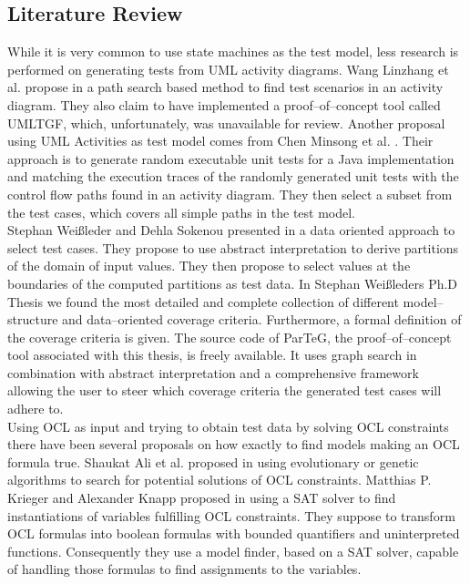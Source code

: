 \documentclass[runningheads,a4paper]{llncs}%
\begin{document}
\subsection{Literature Review}%
While it is very common to use state machines as the test model, less research is performed on generating tests from UML activity diagrams. Wang Linzhang et al. propose in \cite{Linzhang04GeneratingTestCasefromActivityGrayBoxMethod} a path search based method to find test scenarios in an activity diagram. They also claim to have implemented a proof--of--concept tool called UMLTGF, which, unfortunately, was unavailable for review. Another proposal using UML Activities as test model comes from Chen Minsong et al. \cite{mingsong2006automatic}. Their approach is to generate random executable unit tests for a Java implementation and matching the execution traces of the randomly generated unit tests with the control flow paths found in an activity diagram. They then select a subset from the test cases, which covers all simple paths in the test model.%
\\%
Stephan Wei{\ss}leder and Dehla Sokenou presented in \cite{weissleder2008automatic} a data oriented approach to select test cases. They propose to use abstract interpretation to derive partitions of the domain of input values. They then propose to select values at the boundaries of the computed partitions as test data.%
In Stephan Wei{\ss}leders Ph.D Thesis \cite{ParTeG} we found the most detailed and complete collection of different model--structure and data--oriented coverage criteria. Furthermore, a formal definition of the coverage criteria is given. The source code of ParTeG, the proof--of--concept tool associated with this thesis, is freely available. It uses graph search in combination with abstract interpretation and a comprehensive framework allowing the user to steer which coverage criteria the generated test cases will adhere to.\\
Using OCL as input and trying to obtain test data by solving OCL constraints there have been several proposals on how exactly to find models making an OCL formula true. Shaukat Ali et al. proposed in \cite{ali2011search} using evolutionary or genetic algorithms to search for potential solutions of OCL constraints. Matthias P. Krieger and Alexander Knapp proposed in \cite{krieger2008executingUnderspecifiedOCL} using a SAT solver to find instantiations of variables fulfilling OCL constraints. They suppose to transform OCL formulas into boolean formulas with bounded quantifiers and uninterpreted functions. Consequently they use a model finder, based on a SAT solver, capable of handling those formulas to find assignments to the variables.\\%
\end{document}
